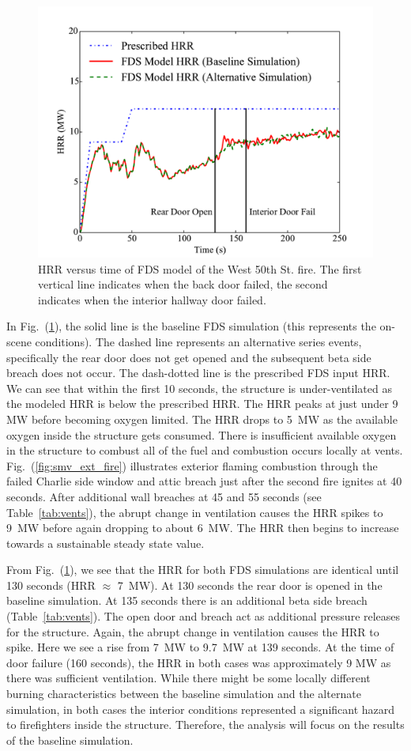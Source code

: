 \documentclass[11pt,oneside]{book}
\begin{document}
\begin{figure}[h!]
\centering
\includegraphics[width=.80\textwidth]{../Figures/Chicago_Fire_HRR}
\caption{HRR versus time of FDS model of the West 50th St. fire. The first vertical line indicates when the back door failed, the second indicates when the interior hallway door failed.}
\label{fig:hrr}
\end{figure}

In Fig.~(\ref{fig:hrr}), the solid line is the baseline FDS simulation (this represents the on-scene conditions). The dashed line represents an alternative series events, specifically the rear door does not get opened and the subsequent beta side breach does not occur. The dash-dotted line is the prescribed FDS input HRR. We can see that within the first 10 seconds, the structure is under-ventilated as the modeled HRR is below the prescribed HRR. The HRR peaks at just under 9 MW before becoming oxygen limited. The HRR drops to 5~MW as the available oxygen inside the structure gets consumed. There is insufficient available oxygen in the structure to combust all of the fuel and combustion occurs locally at vents. Fig.~(\ref{fig:smv_ext_fire}) illustrates exterior flaming combustion through the failed Charlie side window and attic breach just after the second fire ignites at 40 seconds. After additional wall breaches at 45 and 55 seconds (see Table~\ref{tab:vents}), the abrupt change in ventilation causes the HRR spikes to 9~MW before again dropping to about 6~MW. The HRR then begins to increase towards a sustainable steady state value.

From Fig.~(\ref{fig:hrr}), we see that the HRR for both FDS simulations are identical until 130 seconds (HRR $\approx$ 7~MW). At 130 seconds the rear door is opened in the baseline simulation. At 135 seconds there is an additional beta side breach (Table~\ref{tab:vents}). The open door and breach act as additional pressure releases for the structure. Again, the abrupt change in ventilation causes the HRR to spike. Here we see a rise from 7~MW to 9.7~MW at 139 seconds. At the time of door failure (160 seconds), the HRR in both cases was approximately 9 MW as there was sufficient ventilation. While there might be some locally different burning characteristics between the baseline simulation and the alternate simulation, in both cases the interior conditions represented a significant hazard to firefighters inside the structure. Therefore, the analysis will focus on the results of the baseline simulation.
\end{document}
